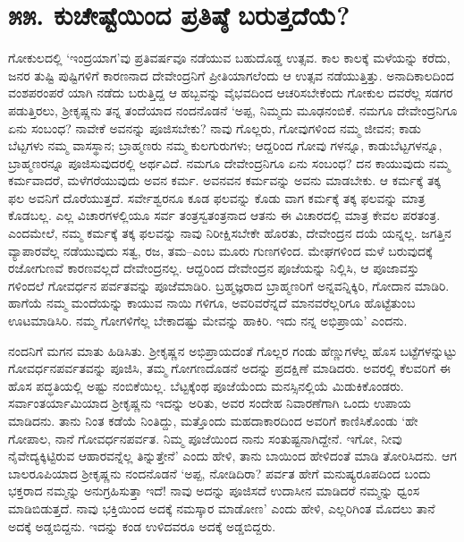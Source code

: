 
\chapter{೫೫. ಕುಚೇಷ್ಟೆಯಿಂದ ಪ್ರತಿಷ್ಠೆ ಬರುತ್ತದೆಯೆ?}

ಗೋಕುಲದಲ್ಲಿ ‘ಇಂದ್ರಯಾಗ’ವು ಪ್ರತಿವರ್ಷವೂ ನಡೆಯುವ ಬಹುದೊಡ್ಡ ಉತ್ಸವ. ಕಾಲ ಕಾಲಕ್ಕೆ ಮಳೆಯನ್ನು ಕರೆದು, ಜನರ ತುಷ್ಟಿ ಪುಷ್ಟಿಗಳಿಗೆ ಕಾರಣನಾದ ದೇವೇಂದ್ರನಿಗೆ ಪ್ರೀತಿಯಾಗಲೆಂದು ಆ ಉತ್ಸವ ನಡೆಯುತ್ತಿತ್ತು. ಅನಾದಿಕಾಲದಿಂದ ವಂಶಪರಂಪರೆ ಯಾಗಿ ನಡೆದು ಬರುತ್ತಿದ್ದ ಆ ಹಬ್ಬವನ್ನು ವೈಭವದಿಂದ ಆಚರಿಸಬೇಕೆಂದು ಗೋಕುಲ ದವರೆಲ್ಲ ಸಡಗರ ಪಡುತ್ತಿರಲು, ಶ್ರೀಕೃಷ್ಣನು ತನ್ನ ತಂದೆಯಾದ ನಂದನೊಡನೆ ‘ಅಪ್ಪ, ನಿಮ್ಮದು ಮೂಢನಂಬಿಕೆ. ನಮಗೂ ದೇವೇಂದ್ರನಿಗೂ ಏನು ಸಂಬಂಧ? ನಾವೇಕೆ ಅವನನ್ನು ಪೂಜಿಸಬೇಕು? ನಾವು ಗೊಲ್ಲರು, ಗೋವುಗಳಿಂದ ನಮ್ಮ ಜೀವನ; ಕಾಡು ಬೆಟ್ಟಗಳು ನಮ್ಮ ವಾಸಸ್ಥಾನ; ಬ್ರಾಹ್ಮಣರು ನಮ್ಮ ಕುಲಗುರುಗಳು; ಆದ್ದರಿಂದ ಗೋವು ಗಳನ್ನೂ, ಕಾಡುಬೆಟ್ಟಗಳನ್ನೂ, ಬ್ರಾಹ್ಮಣರನ್ನೂ ಪೂಜಿಸುವುದರಲ್ಲಿ ಅರ್ಥವಿದೆ. ನಮಗೂ ದೇವೇಂದ್ರನಿಗೂ ಏನು ಸಂಬಂಧ? ದನ ಕಾಯುವುದು ನಮ್ಮ ಕರ್ಮವಾದರೆ, ಮಳೆಗರೆಯುವುದು ಅವನ ಕರ್ಮ. ಅವನವನ ಕರ್ಮವನ್ನು ಅವನು ಮಾಡಬೇಕು. ಆ ಕರ್ಮಕ್ಕೆ ತಕ್ಕ ಫಲ ಅವನಿಗೆ ದೊರೆಯುತ್ತದೆ. ಸರ್ವೇಶ್ವರನೂ ಕೂಡ ಫಲವನ್ನು ಕೊಡು ವಾಗ ಕರ್ಮಕ್ಕೆ ತಕ್ಕ ಫಲವನ್ನು ಮಾತ್ರ ಕೊಡಬಲ್ಲ. ಎಲ್ಲ ವಿಚಾರಗಳಲ್ಲಿಯೂ ಸರ್ವ ತಂತ್ರಸ್ವತಂತ್ರನಾದ ಆತನು ಈ ವಿಚಾರದಲ್ಲಿ ಮಾತ್ರ ಕೇವಲ ಪರತಂತ್ರ. ಎಂದಮೇಲೆ, ನಮ್ಮ ಕರ್ಮಕ್ಕೆ ತಕ್ಕ ಫಲವನ್ನು ನಾವು ನಿರೀಕ್ಷಿಸಬೇಕೇ ಹೊರತು, ದೇವೇಂದ್ರನ ದಯೆ ಯನ್ನಲ್ಲ. ಜಗತ್ತಿನ ವ್ಯಾಪಾರವೆಲ್ಲ ನಡೆಯುವುದು ಸತ್ವ, ರಜ, ತಮ–ಎಂಬ ಮೂರು ಗುಣಗಳಿಂದ. ಮೇಘಗಳಿಂದ ಮಳೆ ಬರುವುದಕ್ಕೆ ರಜೋಗುಣವೆ ಕಾರಣವಲ್ಲದೆ ದೇವೇಂದ್ರನಲ್ಲ. ಆದ್ದರಿಂದ ದೇವೇಂದ್ರನ ಪೂಜೆಯನ್ನು ನಿಲ್ಲಿಸಿ, ಆ ಪೂಜಾವಸ್ತು ಗಳಿಂದಲೆ ಗೋವರ್ಧನ ಪರ್ವತವನ್ನು ಪೂಜೆಮಾಡಿರಿ. ಬ್ರಹ್ಮಜ್ಞರಾದ ಬ್ರಾಹ್ಮಣರಿಗೆ ಅನ್ನವನ್ನಿಕ್ಕಿರಿ, ಗೋದಾನ ಮಾಡಿರಿ. ಹಾಗೆಯೆ ನಮ್ಮ ಮಂದೆಯನ್ನು ಕಾಯುವ ನಾಯಿ ಗಳಿಗೂ, ಅವರಿವರೆನ್ನದೆ ಮಾನವರೆಲ್ಲರಿಗೂ ಹೊಟ್ಟೆತುಂಬ ಊಟಮಾಡಿಸಿರಿ. ನಮ್ಮ ಗೋಗಳಿಗೆಲ್ಲ ಬೇಕಾದಷ್ಟು ಮೇವನ್ನು ಹಾಕಿರಿ. ಇದು ನನ್ನ ಅಭಿಪ್ರಾಯ’ ಎಂದನು. 

ನಂದನಿಗೆ ಮಗನ ಮಾತು ಹಿಡಿಸಿತು. ಶ್ರೀಕೃಷ್ಣನ ಅಭಿಪ್ರಾಯದಂತೆ ಗೊಲ್ಲರ ಗಂಡು ಹೆಣ್ಣುಗಳೆಲ್ಲ ಹೊಸ ಬಟ್ಟೆಗಳನ್ನುಟ್ಟು ಗೋವರ್ಧನಪರ್ವತವನ್ನು ಪೂಜಿಸಿ, ತಮ್ಮ ಗೋಗಣದೊಡನೆ ಅದನ್ನು ಪ್ರದಕ್ಷಿಣೆ ಮಾಡಿದರು. ಅವರಲ್ಲಿ ಕೆಲವರಿಗೆ ಈ ಹೊಸ ಪದ್ಧತಿಯಲ್ಲಿ ಅಷ್ಟು ನಂಬಿಕೆಯಿಲ್ಲ. ಬೆಟ್ಟಕ್ಕೆಂಥ ಪೂಜೆಯೆಂದು ಮನಸ್ಸಿನಲ್ಲಿಯೆ ಮಿಡುಕಿಕೊಂಡರು. ಸರ್ವಾಂತರ್ಯಾಮಿಯಾದ ಶ್ರೀಕೃಷ್ಣನು ಇದನ್ನು ಅರಿತು, ಅವರ ಸಂದೇಹ ನಿವಾರಣೆಗಾಗಿ ಒಂದು ಉಪಾಯ ಮಾಡಿದನು. ತಾನು ನಿಂತ ಕಡೆಯೆ ನಿಂತಿದ್ದು, ಮತ್ತೊಂದು ಮಹದಾಕಾರದಿಂದ ಅವರಿಗೆ ಕಾಣಿಸಿಕೊಂಡು ‘ಹೇ ಗೋಪಾಲ, ನಾನೆ ಗೋವರ್ಧನಪರ್ವತ. ನಿಮ್ಮ ಪೂಜೆಯಿಂದ ನಾನು ಸಂತುಷ್ಟನಾಗಿದ್ದೇನೆ. ಇಗೋ, ನೀವು ನೈವೇದ್ಯಕ್ಕಿಟ್ಟಿರುವ ಆಹಾರವನ್ನೆಲ್ಲ ತಿನ್ನುತ್ತೇನೆ’ ಎಂದು ಹೇಳಿ, ತಾನು ಬಾಯಿಂದ ಹೇಳಿದಂತೆ ಮಾಡಿ ತೋರಿಸಿದನು. ಆಗ ಬಾಲರೂಪಿಯಾದ ಶ್ರೀಕೃಷ್ಣನು ನಂದನೊಡನೆ ‘ಅಪ್ಪ, ನೋಡಿದಿರಾ? ಪರ್ವತ ಹೇಗೆ ಮನುಷ್ಯರೂಪದಿಂದ ಬಂದು ಭಕ್ತರಾದ ನಮ್ಮನ್ನು ಅನುಗ್ರಹಿಸುತ್ತಾ ಇದೆ! ನಾವು ಅದನ್ನು ಪೂಜಿಸದೆ ಉದಾಸೀನ ಮಾಡಿದರೆ ನಮ್ಮನ್ನು ಧ್ವಂಸ ಮಾಡಿಬಿಡುತ್ತದೆ. ನಾವು ಭಕ್ತಿಯಿಂದ ಅದಕ್ಕೆ ನಮಸ್ಕಾರ ಮಾಡೋಣ’ ಎಂದು ಹೇಳಿ, ಎಲ್ಲರಿಗಿಂತ ಮೊದಲು ತಾನೆ ಅದಕ್ಕೆ ಅಡ್ಡಬಿದ್ದನು. ಇದನ್ನು ಕಂಡ ಉಳಿದವರೂ ಅದಕ್ಕೆ ಅಡ್ಡಬಿದ್ದರು.

